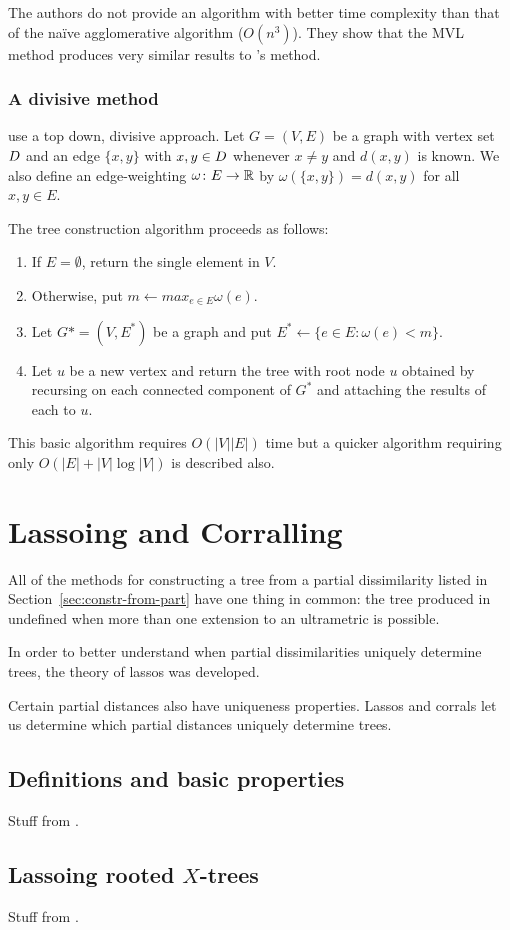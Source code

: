 The authors do not provide an algorithm with better time complexity than that
of the naïve agglomerative algorithm ($O(n^3)$).  They show that the MVL
method produces very similar results to \citeauthor{de1984ultrametric}'s
method.

\subsubsection{A divisive method}
\label{sec:part-dist-divisive-method}

\citet{farach1995robust} use a top down, divisive approach.  Let $G=(V,E)$ be
a graph with vertex set $D$ and an edge $\{x,y\}$ with $x,y \in D$
whenever $x \neq y$ and $d(x,y)$ is known.  We also define an edge-weighting
$\omega \colon E \to {\mathbb R}$ by $\omega(\{x,y\}) = d(x,y)$ for all $x,y \in E$.

The tree construction algorithm proceeds as follows:
\begin{enumerate}
\item If $E = \emptyset$, return the single element in $V$.
\item Otherwise, put $m \gets max_{e \in E} \omega(e)$.
\item Let $G* = (V,E^*)$ be a graph and put $E^* \gets \{e \in E \colon
  \omega(e) < m\}$.
\item Let $u$ be a new vertex and return the tree with root node $u$ obtained
  by recursing on each connected component of $G^*$ and attaching the results
  of each to $u$.
\end{enumerate}
This basic algorithm requires $O(|V||E|)$ time but a quicker algorithm
requiring only $O(|E| + |V|\log |V|)$ is described also.

\section{Lassoing and Corralling}
\label{sec:lassoing-corralling}

All of the methods for constructing a tree from a partial dissimilarity listed
in Section~\ref{sec:constr-from-part} have one thing in common: the tree
produced in undefined when more than one extension to an ultrametric is
possible.

In order to better understand when partial dissimilarities uniquely determine
trees, the theory of lassos was developed.

Certain partial distances also have uniqueness properties.  Lassos and corrals
let us determine which partial distances uniquely determine trees.

\subsection{Definitions and basic properties}
\label{sec:defin-basic-prop}

Stuff from \citep{DHS11}.

\subsection{Lassoing rooted $X$-trees}
\label{sec:lassoing-rooted-x}

Stuff from \citep{HP13}.

